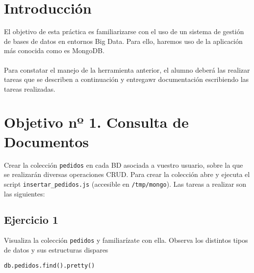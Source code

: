 \newpage %

\tableofcontents %


\newpage


\section{Introducción}

El objetivo de esta práctica es familiarizarse con el uso de un sistema de gestión de bases de datos en entornos Big Data. Para ello, haremos uso de la aplicación más conocida como es MongoDB.
\\ \\
Para constatar el manejo de la herramienta anterior, el alumno deberá las realizar tareas que se describen a continuación y entregawr documentación escribiendo las tareas realizadas.

\section{Objetivo nº 1. Consulta de Documentos}

Crear la colección \texttt{pedidos} en cada BD asociada a vuestro usuario, sobre la que se realizarán diversas operaciones CRUD. Para crear la colección abre y ejecuta el script \texttt{insertar\_pedidos.js} (accesible en \texttt{/tmp/mongo}). Las tareas a realizar son las siguientes:

\subsection{Ejercicio 1}

Visualiza la colección \texttt{pedidos} y familiarízate con ella. Observa los distintos tipos de datos y sus estructuras dispares

\begin{lstlisting}
db.pedidos.find().pretty()
\end{lstlisting}


